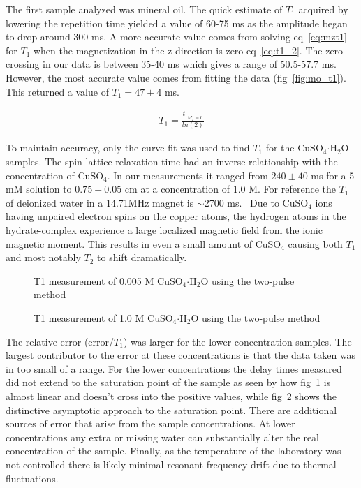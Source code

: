 \documentclass[
reprint,
amsmath,amssymb,
aps,
tikz,
border=5pt
]{revtex4-1}
\newcommand*{\cuso}[1][]{CuSO$_{4} \boldsymbol{\cdot} $H$_2$O }
\newcommand*{\tc}[1][1]{$T_#1$ }
\begin{document}
    The first sample analyzed was mineral oil. The quick estimate of \tc acquired by lowering the repetition time yielded a value of 60-75 ms as the amplitude began to drop around 300 ms. A more accurate value comes from solving eq~\ref{eq:mzt1} for \tc when the magnetization in the z-direction is zero eq~\ref{eq:t1_2}. The zero crossing in our data is between 35-40 ms which gives a range of 50.5-57.7 ms. However, the most accurate value comes from fitting the data (fig~\ref{fig:mo_t1}). This returned a value of $T_1=47\pm 4$ ms.

    \begin{gather}
        T_1 = \frac{t|_{M_z=0}}{ln(2)} \label{eq:t1_2}
    \end{gather}

    To maintain accuracy, only the curve fit was used to find \tc for the \cuso samples. The spin-lattice relaxation time had an inverse relationship with the concentration of CuSO$_4$. In our measurements it ranged from $240\pm40$ ms for a 5 mM solution to $0.75\pm0.05$ cm at a concentration of 1.0 M. For reference the \tc of deionized water in a 14.71MHz magnet is $\sim$2700 ms.~\cite{medphys} Due to CuSO$_4$ ions having unpaired electron spins on the copper atoms, the hydrogen atoms in the hydrate-complex experience a large localized magnetic field from the ionic magnetic moment. This results in even a small amount of CuSO$_4$ causing both \tc and most notably \tc[2] to shift dramatically.~\cite{nmr65}

    
    \begin{figure}[t]
        \resizebox{0.45\textwidth}{!}{}
        \caption{T1 measurement of 0.005 M  CuSO$_{4} \boldsymbol{\cdot} $H$_2$O using the two-pulse method }
        \label{fig:0d005_t1}
      \end{figure}
    
      \begin{figure}[b]
        \resizebox{0.45\textwidth}{!}{}
        \caption{T1 measurement of 1.0 M  CuSO$_{4} \boldsymbol{\cdot} $H$_2$O using the two-pulse method }
        \label{fig:1d0_t1}
      \end{figure}
    
    The relative error (error/$T_1$) was larger for the lower concentration samples. The largest contributor to the error at these concentrations is that the data taken was in too small of a range. For the lower concentrations the delay times measured did not extend to the saturation point of the sample as seen by how fig~\ref{fig:0d005_t1} is almost linear and doesn't cross into the positive values, while fig~\ref{fig:1d0_t1} shows the distinctive asymptotic approach to the saturation point. There are additional sources of error that arise from the sample concentrations. At lower concentrations any extra or missing water can substantially alter the real concentration of the sample. Finally, as the temperature of the laboratory was not controlled there is likely minimal resonant frequency drift due to thermal fluctuations. 
\end{document}

